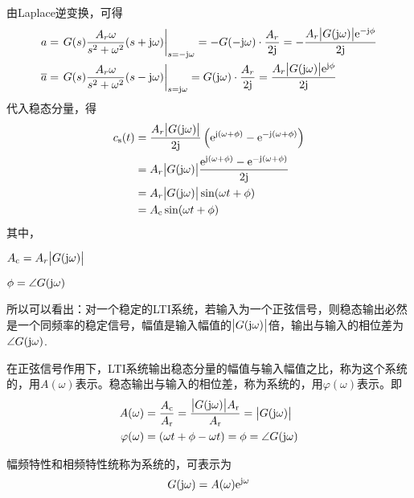 由Laplace逆变换，可得
\begin{align}
	a &= \left. G(s)\dfrac{A_r \omega}{s^2 + \omega^2}(s + \text{j} \omega)\right|_{s = -\text{j} \omega} = -G(- \text{j} \omega )\cdot \dfrac{A_r}{2 \text{j}} = - \dfrac{A_r \big|G(\text{j} \omega)\big|{\rm{e}}^{-\text{j} \phi}}{2\text{j}}\\
	\overline{a} &=  \left. G(s)\dfrac{A_r \omega}{s^2 + \omega^2}(s - \text{j} \omega)\right|_{s = \text{j} \omega} = G( \text{j} \omega )\cdot \dfrac{A_r}{2 \text{j}} =  \dfrac{A_r \big|G(\text{j} \omega)\big|{\rm{e}}^{\text{j} \phi}}{2\text{j}}
\end{align}
代入稳态分量，得
\begin{align}
	c_{\text{s}}(t) &= \dfrac{A_r \big|G(\text{j} \omega)\big|}{2 \text{j}}\left({\rm{e}}^{\text{j} (\omega + \phi)} - {\rm{e}}^{- \text{j} (\omega + \phi)}\right)\notag\\
	& = A_r \big|G(\text{j} \omega)\big|\dfrac{{\rm{e}}^{\text{j} (\omega + \phi)} - {\rm{e}}^{- \text{j} (\omega + \phi)}}{2 \text{j}}\notag\\
	& = A_r \big|G(\text{j} \omega)\big| \sin(\omega t + \phi)\\
	& = A_\text{c} \sin (\omega t + \phi)
\end{align}
 其中，
 \begin{myitemize}
 	\item $A_\text{c} = A_r \big|G(\text{j} \omega)\big|$\vspace*{-0.5em}
 	\item $\phi = \angle G(\text{j} \omega)$\vspace*{0.3em}
 \end{myitemize}
\vspace*{0.5em}
所以可以看出：对一个稳定的LTI系统，若输入为一个正弦信号，则稳态输出必然是一个同频率的稳定信号，幅值是输入幅值的$\big|G(\text{j} \omega)\big|$倍，输出与输入的相位差为$\angle G(\text{j} \omega)$.
\vspace*{0.5em}

在正弦信号作用下，LTI系统输出稳态分量的幅值与输入幅值之比，称为这个系统的，用$A(\omega)$表示。稳态输出与输入的相位差，称为系统的，用$\varphi(\omega)$表示。即
\vspace*{0.5em}
\begin{align}
	A(\omega) &= \dfrac{A_{\text{c}}}{A_{\text{r}}} = \dfrac{\big|G(\text{j} \omega)\big|A_\text{r}}{A_\text{r}} = \big|G(\text{j} \omega)\big|\\
	\varphi(\omega) &= (\omega t + \phi - \omega t) = \phi = \angle G(\text{j} \omega)
\end{align}

\noindent 幅频特性和相频特性统称为系统的，可表示为
\begin{align}
	G(\text{j} \omega) = A(\omega) {\rm{e}}^{\text{j} \omega}
\end{align}
\vspace*{-3em}

